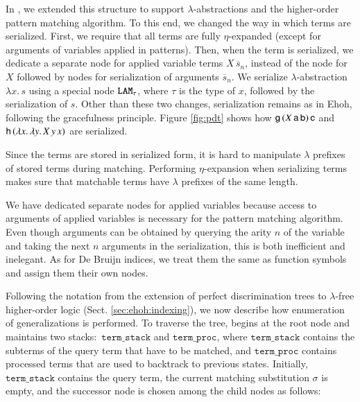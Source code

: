 In \ehohii{}, we extended this structure to support $\lambda$-abstractions and
the higher-order pattern matching algorithm.
To this end, we changed the way in which terms are
serialized. First, we require that all terms are fully $\eta$-expanded (except
for arguments of variables applied in patterns). Then, when the term is serialized,
we dedicate a separate node for applied variable terms $X \, \overline{s}_n$,
instead of the node for $X$ followed by nodes for serialization of arguments
$\overline{s}_n$. We serialize $\lambda$-abstraction $\lambda x.\, s$ using
a special node $\texttt{LAM}_\tau$, where $\tau$ is the type of $x$,
followed by the serialization of $s$. Other than these two changes, serialization
remains as in Ehoh, following the gracefulness principle.
Figure \ref{fig:pdt} shows how $\mathsf{g} \,
(X\,\mathsf{a}\,\mathsf{b}) \, \mathsf{c}$ and $\mathsf{h} \, (\lambda x. \, \lambda y. \, X
\, y \, x)$ are serialized.

Since the terms are stored in serialized form, it is hard to manipulate
$\lambda$ prefixes of stored terms during matching. Performing $\eta$-expansion
when serializing terms makes sure that matchable terms have
$\lambda$ prefixes of the same length.

We have dedicated separate nodes for applied variables because access to arguments
of applied variables is necessary for the pattern matching algorithm. Even though
arguments can be obtained by querying the arity $n$ of the variable and taking
the next $n$ arguments in the serialization, this is both inefficient and inelegant.
As for De Bruijn indices, we treat them the same as function symbols and assign
them their own nodes.

\newcommand{\tstack}{\ensuremath{\texttt{term\_stack}}}
\newcommand{\tproc}{\ensuremath{\texttt{term\_proc}}}

Following the notation from the extension of perfect discrimination trees to
$\lambda$-free higher-order logic (Sect. \ref{sec:ehoh:indexing}), we now describe how enumeration of
generalizations is performed. To traverse the tree, \ehohii{} begins at the root
node and maintains two stacks:\ \tstack{} and \tproc{}, where \tstack{} contains the
subterms of the query term that have to be matched, and \tproc{} contains
processed terms that are used to backtrack to previous states. Initially,
\tstack{} contains the query term, the current matching substitution
$\sigma$ is empty, and the successor node is chosen among the child nodes as
follows:

